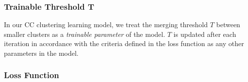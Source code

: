 \subsubsection*{{\bf Trainable Threshold T}} In our CC clustering learning model,
we treat the merging threshold $T$ between smaller clusters as a {\em
  trainable parameter} of the model. $T$ is updated after each
iteration in accordance with the criteria defined in the loss function
as any other parameters in the model.




\subsubsection*{{\bf Loss Function}}


